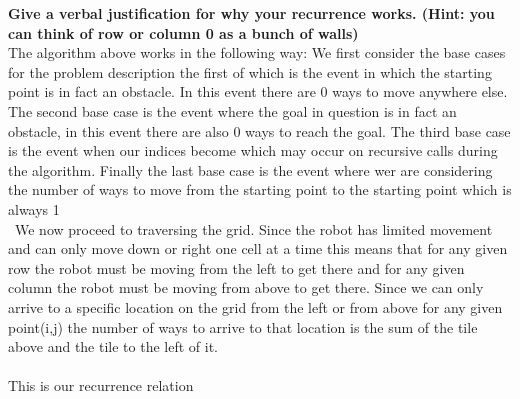 \documentclass[11pt]{article}
\theoremstyle{definition}  %
\begin{document}
\textbf{Give a verbal justification for why your recurrence works. (Hint: you can think of row or column 0 as a bunch of walls)}\\
The algorithm above works in the following way: We first consider the base cases for the problem description the first of which is the event in which the starting point is in fact an obstacle. In this event there are 0 ways to move anywhere else. The second base case is the event where the goal in question is in fact an obstacle, in this event there are also 0 ways to reach the goal. The third base case is the event when our indices become  which may occur on recursive calls during the algorithm. Finally the last base case is the event where wer are considering the number of ways to move from the starting point to the starting point which is always 1 \\\
We now proceed to traversing the grid. Since the robot has limited movement and can only move down or right one cell at a time this means that for any given row the robot must be moving from the left to get there and for any given column the robot must be moving from above to get there. Since we can only arrive to a specific location on the grid from the left or from above for any given point(i,j) the number of ways to arrive to that location is the sum of the tile above and the tile to the left of it.\\\\
This is our recurrence relation
\end{document}
